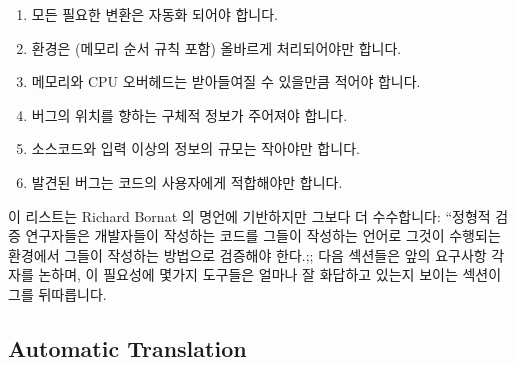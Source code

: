 \begin{enumerate}
\item	모든 필요한 변환은 자동화 되어야 합니다.
\item	환경은 (메모리 순서 규칙 포함) 올바르게 처리되어야만 합니다.
\item	메모리와 CPU 오버헤드는 받아들여질 수 있을만큼 적어야 합니다.
\item	버그의 위치를 향하는 구체적 정보가 주어져야 합니다.
\item	소스코드와 입력 이상의 정보의 규모는 작아야만 합니다.
\item	발견된 버그는 코드의 사용자에게 적합해야만 합니다.

\iffalse

\item	Any required translation must be automated.
\item	The environment (including memory ordering) must be correctly
	handled.
\item	The memory and CPU overhead must be acceptably modest.
\item	Specific information leading to the location of the bug
	must be provided.
\item	Information beyond the source code and inputs must be
	modest in scope.
\item	The bugs located must be relevant to the code's users.

\fi

\end{enumerate}

이 리스트는 Richard Bornat 의 명언에 기반하지만 그보다 더 수수합니다: ``정형적
검증 연구자들은 개발자들이 작성하는 코드를 그들이 작성하는 언어로 그것이
수행되는 환경에서 그들이 작성하는 방법으로 검증해야 한다.;;
다음 섹션들은 앞의 요구사항 각자를 논하며, 이 필요성에 몇가지 도구들은 얼마나
잘 화답하고 있는지 보이는 섹션이 그를 뒤따릅니다.

\iffalse

This list builds on, but is somewhat more modest than, Richard Bornat's
dictum: ``Formal-verification researchers should verify the code that
developers write, in the language they write it in, running in the
environment that it runs in, as they write it.''
The following sections discuss each of the above requirements, followed
by a section presenting a scorecard of how well a few tools stack up
against these requirements.

\fi

\subsection{Automatic Translation}
\label{sec:future:Automatic Translation}


